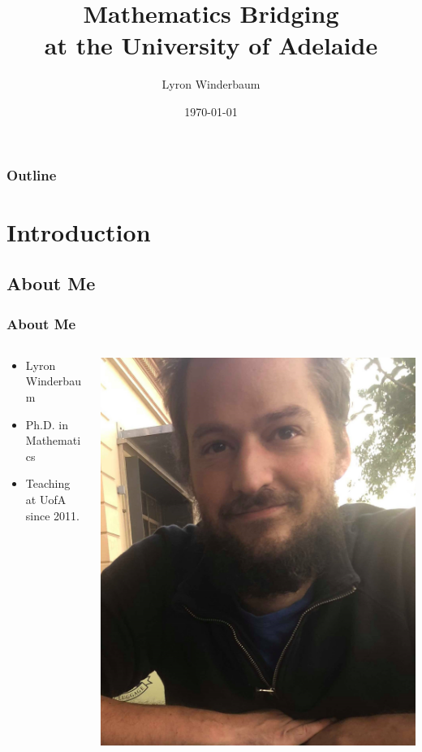 \documentclass[14pt]{beamer}
\title{Mathematics Bridging \\ at the University of Adelaide}
\author{Lyron Winderbaum}
\institute{University of Adelaide}
\date{\today}
\begin{document}
\begin{frame}
\titlepage
\end{frame}

\begin{frame}
\frametitle{Outline}
\tableofcontents
\end{frame}

\section{Introduction}

\subsection{About Me}
\begin{frame}
\frametitle{About Me}
\begin{minipage}[0.4\textheight]{\textwidth}
\begin{columns}[T]
\begin{column}{0.6\textwidth}
\begin{itemize}
	\item Lyron Winderbaum
	\item Ph.D. in Mathematics
	\item Teaching at UofA since 2011.
\end{itemize}
\end{column}
\begin{column}{0.4\textwidth}
	\includegraphics[scale=0.1]{../../photos/portrait.jpg}
\end{column}
\end{columns}
\end{minipage}
\end{frame}
\end{document}

